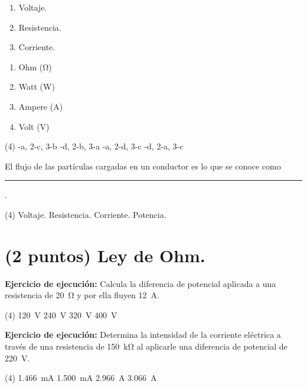 \documentclass[12pt, letter]{exam}
\begin{document}
\begin{questions}
    \begin{minipage}[t]{0.4\linewidth}
        \begin{enumerate}[label=\arabic*)]
            \item Voltaje.
            \item Resistencia.
            \item Corriente.
        \end{enumerate}
    \end{minipage}
    \begin{minipage}[t]{0.4\linewidth}
        \begin{enumerate}[label=\alph*)]
            \item Ohm (\unit{\ohm})
            \item Watt (\unit{\watt})
            \item Ampere (\unit{\ampere})
            \item Volt (\unit{\volt})
        \end{enumerate}
    \end{minipage}
    \begin{tasks}(4)
        -a, 2-c, 3-b
        -d, 2-b, 3-a
        -a, 2-d, 3-c
        -d, 2-a, 3-c
    \end{tasks}
    \question El flujo de las partículas cargadas en un conductor es lo que se conoce como \rule{2cm}{0.1mm}.
    \begin{tasks}(4)
        \task Voltaje.
        \task Resistencia.
        \task Corriente.
        \task Potencia.
    \end{tasks}

    \section{(2 puntos) Ley de Ohm.}

    \question \label{Ejercicio_10} \label{Problema_03} \textbf{Ejercicio de ejecución: } Calcula la diferencia de potencial aplicada a una resistencia de \SI{20}{\ohm} y por ella fluyen \SI{12}{\ampere}.
    \begin{tasks}(4)
        \task \SI{120}{\volt}
        \task \SI{240}{\volt}
        \task \SI{320}{\volt}
        \task \SI{400}{\volt}
    \end{tasks}
    \question \label{Ejercicio_11} \label{Problema_02} \textbf{Ejercicio de ejecución: } Determina la intensidad de la corriente eléctrica a través de una resistencia de \SI{150}{\kilo\ohm} al aplicarle una diferencia de potencial de \SI{220}{\volt}.
    \begin{tasks}(4)
        \task \SI{1.466}{\milli\ampere}
        \task \SI{1.500}{\milli\ampere}
        \task \SI{2.966}{\ampere}
        \task \SI{3.066}{\ampere}
    \end{tasks}


\end{questions}
\end{document}
